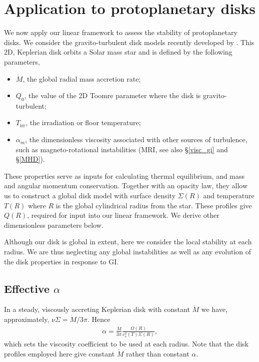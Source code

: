 \section{Application to protoplanetary disks}\label{2dppd}
We now apply our linear framework to assess the stability of  
protoplanetary disks. We consider the gravito-turbulent disk models recently
developed by \cite[][hereafter ]{rafikov15}. 
This 2D, Keplerian disk orbits a Solar 
mass star and is defined by the following parameters, 

\begin{itemize}
  \item $\dot{M}$, the global radial mass accretion rate;
  \item $Q_0$, the value of the 2D Toomre parameter where the disk is
    gravito-turbulent;
  \item $T_\mathrm{irr}$, the irradiation or floor temperature;
  \item $\alpha_m$, the dimensionless viscosity associated with other
    sources of turbulence, such as magneto-rotational instabilities
    (MRI, see also \S\ref{visc_gi} and \S\ref{MHD}). 
\end{itemize} 
These properties serve as inputs for calculating thermal equilibrium, and mass and
angular momentum conservation. Together with an opacity law, 
they allow us to construct a global disk model with surface density $\Sigma(R)$ and
temperature $T(R)$ where $R$ is the global cylindrical radius from the
star.  These profiles give $Q(R)$,
required for input into our linear framework. We derive other
dimensionless parameters below. 

Although our disk is global in extent, here we consider the local stability at each radius.
We are thus neglecting any global instabilities \citep{adams89,lodato05,kratter10} as well as any 
 evolution of the disk properties in response to GI.

\subsection{Effective $\alpha$}
In a steady, viscously accreting Keplerian disk 
with constant $\dot{M}$ we have,
approximately, $\nu\Sigma = \dot{M}/3\pi$. Hence
\begin{align}
  \alpha = \frac{\dot{M}}{3\pi}\frac{\Omega(R)}{c_{s}^2(T)\Sigma(R)},  
\end{align} 
which sets the viscosity coefficient to be used at each radius. Note that the disk profiles 
employed here give constant $\dot{M}$ rather than constant $\alpha$.

